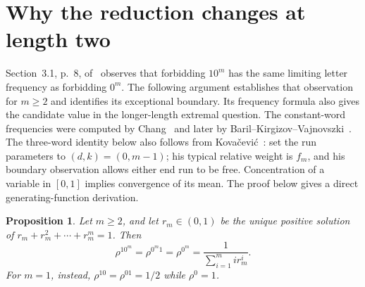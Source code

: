 \documentclass[11pt]{article}
\newtheorem{proposition}[theorem]{Proposition}
\begin{document}
\section{Why the reduction changes at length two}
Section~3.1, p.~8, of~\cite{BMR} observes that forbidding $10^m$ has the same
limiting letter frequency as forbidding $0^m$.
The following argument establishes that observation for $m\geq2$ and
identifies its exceptional boundary. Its frequency formula also gives the
candidate value in the longer-length extremal question.
The constant-word frequencies were computed by Chang~\cite[p.~179]{C}
and later by Baril--Kirgizov--Vajnovszki~\cite[Theorem~1]{BKV}.
The three-word identity below also follows from
Kova\v{c}evi\'c~\cite[Lemmas~1(b), 2 and Remark~4]{K}:
set the run parameters to $(d,k)=(0,m-1)$; his typical relative weight
is $f_m$, and his boundary observation allows either end run to be free.
Concentration of a variable in $[0,1]$ implies convergence of its mean.
The proof below gives a direct generating-function derivation.

\begin{proposition}\label{prop:reduction}
Let $m\geq2$, and let $r_m\in(0,1)$ be the unique positive solution of
$r_m+r_m^2+\cdots+r_m^m=1$. Then
\[
 \rho^{10^m}=\rho^{0^m1}=\rho^{0^m}
 =\frac{1}{\sum_{i=1}^m i r_m^i}.
\]
For $m=1$, instead, $\rho^{10}=\rho^{01}=1/2$ while $\rho^0=1$.
\end{proposition}
\end{document}
